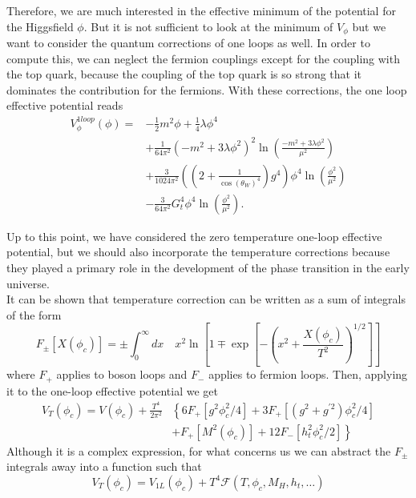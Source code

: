 \documentclass{article}
\numberwithin{equation}{section}
\begin{document}
Therefore, we are much interested in the effective minimum of the potential for the Higgsfield $\phi$. But it is not sufficient to look at the minimum of $V_{\phi}$ but we want to consider the quantum corrections of one loops as well. In order to compute this, we can neglect the fermion couplings except for the coupling with the top quark, because the coupling of the top quark is so strong that it dominates the contribution for the fermions. 
With these corrections, the one loop effective potential reads
\begin{align*}
    V_{\phi}^{1loop}(\phi) =& -\frac{1}{2}m^2\phi + \frac{1}{4}\lambda\phi^4\\
    & +\frac{1}{64\pi^2}(-m^2 +3\lambda\phi^2)^2\ln\left(\frac{-m^2+3\lambda\phi^2}{\mu^2}\right)\\
    &+\frac{3}{1024 \pi^2}((2 + \frac{1}{\cos(\theta_W)^4})g^4)\phi^4 \ln\left(\frac{\phi^2}{\mu^2}\right)\\
    &-\frac{3}{64 \pi^2}G_t^4 \phi^4 \ln\left(\frac{\phi^2}{\mu^2}\right). 
\end{align*}

Up to this point, we have considered the zero temperature one-loop effective potential, but we should also incorporate the temperature corrections because they played a primary role in the development of the phase transition in the early universe.
\\
It can be shown that temperature correction can be written as a sum of integrals of the form
\begin{equation}
F_{\pm}\left[X\left(\phi_{c}\right)\right] = \pm \int_{0}^{\infty} d x \quad x^{2} \ln \left[1 \mp \exp \left[-\left(x^{2}+\frac{X\left(\phi_{c}\right)}{ T^{2}}\right)^{1 / 2}\right]\right]
\end{equation}
where $F_+$ applies to boson loops and $F_-$ applies to fermion loops. Then, applying it to the one-loop effective potential we get
\begin{align*}
V_{T}\left(\phi_{c}\right)=V\left(\phi_{c}\right)+\frac{T^{4}}{2 \pi^{2}}&\left\{6 F_{+}\left[g^{2} \phi_{c}^{2} / 4\right]+3 F_{+}\left[\left(g^{2}+g^{\prime 2}\right) \phi_{c}^{2} / 4\right]\right. \\
&\left.+F_{+}\left[M^{2}\left(\phi_{c}\right)\right]+12 F_{-}\left[h_{t}^{2} \phi_{c}^{2} / 2\right]\right\}
\end{align*}
Although it is a complex expression, for what concerns us we can abstract the $F_{\pm}$ integrals away into a function such that
\begin{equation}
V_{T}\left(\phi_{c}\right)=V_{1 L}\left(\phi_{c}\right)+T^{4} \mathcal{F}\left(T, \phi_{c}, M_{H}, h_{t}, \ldots\right)
\end{equation}
\end{document}
